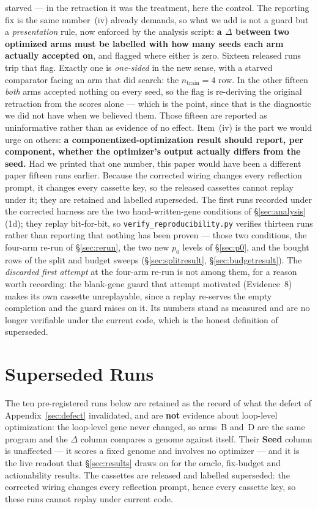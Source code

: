\documentclass[11pt]{article}
\newcommand{\dd}{\ensuremath{\Delta}}
\begin{document}
starved --- in the retraction it was the treatment, here the control. The reporting fix is the
same number~(iv) already demands, so what we add is not a guard but a \emph{presentation} rule,
now enforced by the analysis script: \textbf{a $\dd$ between two optimized arms must be
labelled with how many seeds each arm actually accepted on}, and flagged where either is zero.
Sixteen released runs trip that flag. Exactly one is \emph{one-sided} in the new sense, with a
starved comparator facing an arm that did search: the $n_{\mathrm{train}}{=}4$ row. In the other
fifteen \emph{both} arms accepted nothing on every seed, so the flag is re-deriving the original
retraction from the scores alone --- which is the point, since that is the diagnostic we did not
have when we believed them. Those fifteen are reported as uninformative rather than as evidence
of no effect.
Item~(iv) is the part we would urge on others: \textbf{a
componentized-optimization result should report, per component, whether the optimizer's output
actually differs from the seed.} Had we printed that one number, this paper would have been a
different paper fifteen runs earlier. Because
the corrected wiring changes every reflection prompt, it changes every cassette key, so the
released cassettes cannot replay under it; they are retained and labelled superseded. The
first runs recorded under the corrected harness are the two hand-written-gene conditions of
\S\ref{sec:analysis}(1d); they replay bit-for-bit, so \texttt{verify\_reproducibility.py}
verifies thirteen runs rather than reporting that nothing has been proven --- those two
conditions, the four-arm re-run of \S\ref{sec:rerun}, the two new $p_0$ levels of
\S\ref{sec:p0}, and the bought rows of the split and budget sweeps
(\S\ref{sec:splitresult}, \S\ref{sec:budgetresult}).
The \emph{discarded first attempt} at the four-arm re-run is not among them,
for a reason worth recording: the blank-gene guard that attempt motivated (Evidence~8) makes
its own cassette unreplayable, since a replay re-serves the empty completion and the guard
raises on it. Its numbers stand as measured and are no longer verifiable under the current
code, which is the honest definition of superseded.


\section{Superseded Runs}
\label{sec:superseded}

The ten pre-registered runs below are retained as the record of what the defect of
Appendix~\ref{sec:defect} invalidated, and are \textbf{not} evidence about loop-level
optimization: the loop-level gene never changed, so arms~B and~D are the same program and the
$\dd$ column compares a genome against itself. Their \textbf{Seed} column is unaffected --- it
scores a fixed genome and involves no optimizer --- and it is the live readout that
\S\ref{sec:results} draws on for the oracle, fix-budget and actionability results. The
cassettes are released and labelled superseded: the corrected wiring changes every reflection
prompt, hence every cassette key, so these runs cannot replay under current code.
\end{document}
